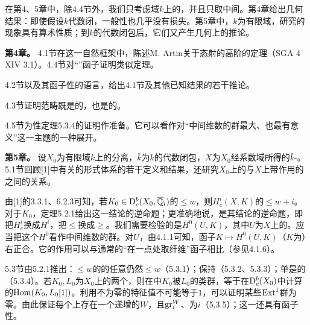 在第4、5章中，除4.4节外，我们只考虑域$k$上的，并且只取中间。第4章给出几何结果：即使假设$k$代数闭，一般性也几乎没有损失。第5章中，$k$为有限域，研究的现象具有算术性质；到$k$的代数闭包后，它们又产生几何上的推论。

\par\medskip\noindent\textbf{第4章。} 4.1节在这一自然框架中，陈述M. Artin关于态射的高阶的定理（SGA 4 XIV 3.1）。4.4节对“”函子证明类似定理。

4.2节以及其函子性的语言，给出4.1节及其他已知结果的若干推论。

4.3节证明范畴既是的，也是的。

4.5节为性定理5.3.4的证明作准备。它可以看作对“中间维数的群最大、也最有意义”这一主题的一种展开。

\par\medskip\noindent\textbf{第5章。} 设$X_0$为有限域$k$上的分离，$\bar k$为$k$的代数闭包，$X$为$X_0$经系数域所得的$\bar k$-。5.1节回顾[1]中有关的形式体系的若干定义和结果，还研究$X_0$上的与$X$上带作用的之间的关系。

由[1]的3.3.1、6.2.3可知，若$K_0\in\mathrm{D}_c^b(X_0,\overline{\mathbb Q}_l)$的$\leq w$，则$H_c^i(X,K)$的$\leq w+i$。对于$K_0$，定理5.2.1给出这一结论的逆命题；更准确地说，是其结论的逆命题，即把$H_c^i$换成$H^i$，把$\leq$换成$\geq$。我们需要检验的是$H^0(U,K)$，其中$U$为$X$上的。应当把这个$H^0$看作中间维数的群。对$U$，由4.1.1可知，函子$K\mapsto H^0(U,K)$（$K$为）右正合。它的作用可以与通常的“在一点处取纤维”函子相比（参见4.1.6）。

5.3节由5.2.1推出：$\leq w$的的任意仍然$\leq w$（5.3.1）；保持（5.3.2、5.3.3）；单是的（5.3.4）。若$K_0,L_0$为$X_0$上的两个，则在中$K_0$被$L_0$的类群，等于在$\mathrm{D}_c^b(X_0)$中计算的$\operatorname{Hom}(K_0,L_0[1])$。利用不为零的特征值不可能等于$1$，可以证明某些$\operatorname{Ext}^1$群为零。由此保证每个上存在一个递增的$W$，且$\operatorname{gr}_i^W$、为$i$（5.3.5）；这一还具有函子性。

